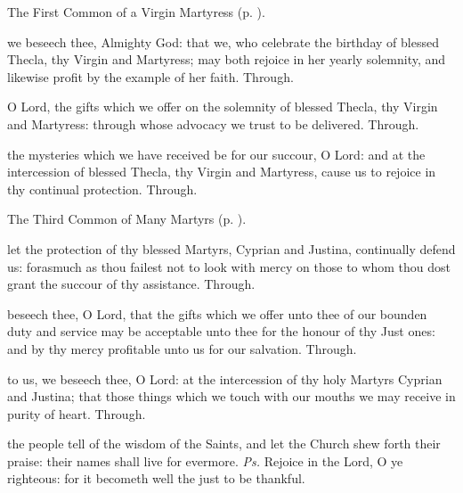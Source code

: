 
\begin{rubric}
	The First Common of a Virgin Martyress (p. \pageref{CommonVirginMartyrI}).
\end{rubric}

\collect\label{TheclaCollect}
 we beseech thee, Almighty God: that we, who celebrate the birthday of blessed Thecla, thy Virgin and Martyress; may both rejoice in her yearly solemnity, and likewise profit by the example of her faith. Through.

\secret\label{TheclaSecret}
 O Lord, the gifts which we offer on the solemnity of blessed Thecla, thy Virgin and Martyress: through whose advocacy we trust to be delivered. Through.

\postcommunion\label{TheclaPostcommunion}
 the mysteries which we have received be for our succour, O Lord: and at the intercession of blessed Thecla, thy Virgin and Martyress, cause us to rejoice in thy continual protection. Through.


\clearpage
{}

\begin{rubric}
	The Third Common of Many Martyrs (p. \pageref{CommonMartyrsIII}).
\end{rubric}

\collect
{} let the protection of thy blessed Martyrs, Cyprian and Justina, continually defend us: forasmuch as thou failest not to look with mercy on those to whom thou dost grant the succour of thy assistance. Through.

\secret
{} beseech thee, O Lord, that the gifts which we offer unto thee of our bounden duty and service may be acceptable unto thee for the honour of thy Just ones: and by thy mercy profitable unto us for our salvation. Through.

\postcommunion
{} to us, we beseech thee, O Lord: at the intercession of thy holy Martyrs Cyprian and Justina; that those things which we touch with our mouths we may receive in purity of heart. Through.



\introit
{} the people tell of the wisdom of the Saints, and let the Church shew forth their praise: their names shall live for evermore. \textit{Ps.} Rejoice in the Lord, O ye righteous: for it becometh well the just to be thankful.


